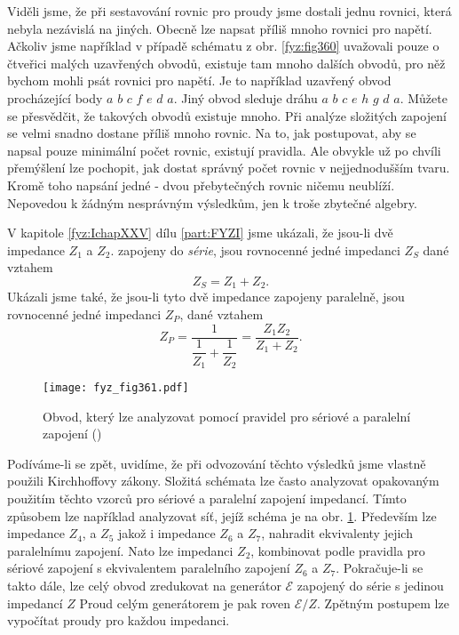   Viděli jsme, že při sestavování rovnic pro proudy jsme dostali jednu rovnici, která nebyla 
  nezávislá na jiných. Obecně lze napsat příliš mnoho rovnici pro napětí. Ačkoliv jsme například v 
  případě schématu z obr. \ref{fyz:fig360} uvažovali pouze o čtveřici malých uzavřených obvodů, 
  existuje tam mnoho dalších obvodů, pro něž bychom mohli psát rovnici pro napětí. Je to například 
  uzavřený obvod procházející body \(a\) \(b\) \(c\) \(f\) \(e\) \(d\) \(a\). Jiný obvod sleduje 
  dráhu \(a\) \(b\) \(c\) \(e\) \(h\) \(g\) \(d\) \(a\). Můžete se přesvědčit, že takových obvodů 
  existuje mnoho. Při analýze složitých zapojení se velmi snadno dostane příliš mnoho rovnic. Na 
  to, jak postupovat, aby se napsal pouze minimální počet rovnic, existují pravidla. Ale obvykle už 
  po chvíli přemýšlení lze pochopit, jak dostat správný počet rovnic v nejjednodušším tvaru. Kromě 
  toho napsání jedné - dvou přebytečných rovnic ničemu neublíží. Nepovedou k žádným nesprávným 
  výsledkům, jen k troše zbytečné algebry.
   
  V kapitole \ref{fyz:IchapXXV} dílu \ref{part:FYZI} jsme ukázali, že jsou-li dvě impedance \(Z_1\) 
  a \(Z_2\). zapojeny do \emph{série}, jsou rovnocenné jedné impedanci \(Z_S\) dané vztahem
  \begin{equation}\label{fyz:eq487}
    Z_S = Z_1 + Z_2.
  \end{equation}
  Ukázali jsme také, že jsou-li tyto dvě impedance zapojeny paralelně, jsou rovnocenné jedné 
  impedanci \(Z_P\), dané vztahem
  \begin{equation}\label{fyz:eq488}
    Z_P = \dfrac{1}{\dfrac{1}{Z_1} + \dfrac{1}{Z_2}} = \frac{Z_1Z_2}{Z_1 + Z_2}.
  \end{equation}
  
  \begin{figure}[ht!] %
    \centering
    \texttt{[image: fyz\_fig361.pdf]}
    \caption{Obvod, který lze analyzovat pomocí pravidel pro sériové a paralelní zapojení
             (\cite[s.~402]{Feynman02})}
    \label{fyz:fig361}
  \end{figure}
  
  Podíváme-li se zpět, uvidíme, že při odvozování těchto výsledků jsme vlastně použili Kirchhoffovy 
  zákony. Složitá schémata lze často analyzovat opakovaným použitím těchto vzorců pro sériové a 
  paralelní zapojení impedancí. Tímto způsobem lze například analyzovat síť, jejíž schéma je na 
  obr. \ref{fyz:fig361}. Především lze impedance \(Z_4\), a \(Z_5\) jakož i impedance \(Z_6\) a 
  \(Z_7\), nahradit ekvivalenty jejich paralelnímu zapojení. Nato lze impedanci \(Z_2\), kombinovat 
  podle pravidla pro sériové zapojení s ekvivalentem paralelního zapojení \(Z_6\) a \(Z_7\). 
  Pokračuje-li se takto dále, lze celý obvod zredukovat na generátor \(\mathscr{E}\) zapojený do 
  série s jedinou impedancí \(Z\) Proud celým generátorem je pak roven \(\mathscr{E}/Z\). Zpětným 
  postupem lze vypočítat proudy pro každou impedanci.

